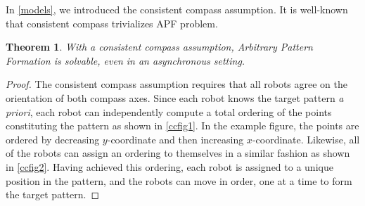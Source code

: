 \documentclass[preprint,10pt]{elsarticle}
\newtheorem{theorem}{Theorem}
\begin{document}
	In \ref{models}, we introduced the consistent compass assumption. It is well-known that consistent compass 
	trivializes APF problem. 
	\begin{theorem} 
		With a consistent compass assumption, Arbitrary Pattern Formation is solvable, even in an asynchronous setting.
		\cite{flocchini08arbitrary}
	\end{theorem} 
	\begin{proof}
		The consistent compass assumption requires that all robots agree on the orientation of both compass
		axes. Since each robot knows the target pattern \textit{a priori}, each robot can independently compute
		a total ordering of the points constituting the pattern as shown in \ref{ccfig1}. In the example figure,
		the points are ordered by decreasing $y$-coordinate and then increasing $x$-coordinate. Likewise, 
		all of the robots can assign an ordering to themselves in a similar fashion as shown in \ref{ccfig2}.
		Having achieved this ordering, each robot is assigned to a unique position in the pattern, and the robots
		can move in order, one at a time to form the target pattern.
	\end{proof}
	
\end{document}
